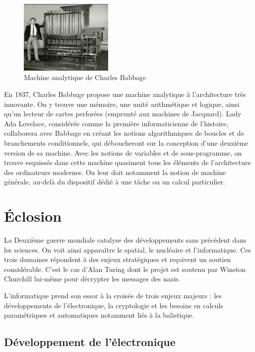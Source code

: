 \documentclass[a4paper,11pt]{book}
\begin{document}
\begin{figure} 
    \centering
    \includegraphics[width=0.4\textwidth]{media/machines/Babbage-1-450x355.png}
    \caption{Machine analytique de Charles Babbage}
\end{figure}

En 1837, Charles Babbage propose une machine analytique à l'architecture très innovante. On y trouve une mémoire, une unité arithmétique et logique, ainsi qu'un lecteur de cartes perforées (emprunté aux machines de Jacquard). Lady Ada Lovelace, considérée comme la première informaticienne de l'histoire, collaborera avec Babbage en créant les notions algorithmiques de boucles et de branchements conditionnels, qui déboucheront sur la conception d'une deuxième version de sa machine. Avec les notions de variables et de sous-programme, on trouve esquissés dans cette machine quasiment tous les éléments de l'architecture des ordinateurs modernes. On leur doit notamment la notion de machine générale, au-delà du dispositif dédié à une tâche ou un calcul particulier.

\section{Éclosion}
La Deuxième guerre mondiale catalyse des développements sans précédent dans les sciences. On voit ainsi apparaître le spatial, le nucléaire et l'informatique. Ces trois domaines répondent à des enjeux stratégiques et reçoivent un soutien considérable. C'est le cas d'Alan Turing dont le projet est soutenu par Winston Churchill lui-même pour décrypter les messages des nazis.

L'informatique prend son essor à la croisée de trois enjeux majeurs : les développements de l'électronique, la cryptologie et les besoins en calculs paramétriques et automatiques notamment liés à la balistique. 

\subsection{Développement de l'électronique}
\end{document}
